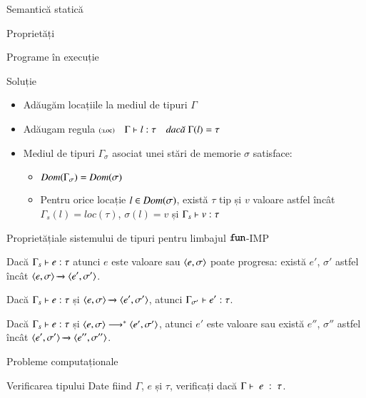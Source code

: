 \begin{section}{Semantică statică}
\begin{subsection}{Proprietăți}
\begin{frame}{Programe în execuție}
 \begin{block}{Soluție}
 \begin{itemize}
 \item Adăugăm locațiile la mediul de tipuri $\Gamma$
 \item Adăugam regula $\reg[:loc]{\T{\Gamma}{l}{\tau}}{}{\Gamma(l) = \tau}$
 \item Mediul de tipuri $\Gamma_\sigma$ asociat unei stări de memorie $\sigma$ satisface:
 \begin{itemize}
 \item $\mathop{\it Dom}(\Gamma_\sigma) = \mathop{\it Dom}(\sigma)$
 \item Pentru orice locație $l\in \mathop{\it Dom}(\sigma)$, există $\tau$ tip și $v$ valoare astfel încât $\Gamma_s(l) = loc(\tau)$, $\sigma(l) = v$ și ${\displaystyle {\Gamma_s} \vdash {v} : {\tau}}$
 \end{itemize}
 \end{itemize}
 \end{block}
\end{frame}

\begin{frame}{Proprietăți}{ale sistemului de tipuri pentru limbajul $\mathrel{\text{\ttfamily fun}}$-IMP}
\begin{theorem} Dacă ${\displaystyle {\Gamma_s} \vdash {e} : {\tau}}$ atunci $e$ este valoare sau ${\langle{e,\sigma}\rangle}$ poate progresa: există $e'$, $\sigma'$ astfel încât $\displaystyle{\ensuremath {{\langle{e,\sigma}\rangle}} \xrightarrow{} {{\ensuremath \langle{e',\sigma'}\rangle}}}$.
\end{theorem}
\vfill

\begin{theorem}
Dacă ${\displaystyle {\Gamma_s} \vdash {e} : {\tau}}$ și $\displaystyle{\ensuremath {{\langle{e,\sigma}\rangle}} \xrightarrow{} {{\ensuremath \langle{e',\sigma'}\rangle}}}$, atunci 
${\displaystyle {\Gamma_{\sigma'}} \vdash {e'} : {\tau}}$.
\end{theorem}

\vfill
\begin{theorem}
Dacă ${\displaystyle {\Gamma_s} \vdash {e} : {\tau}}$ și ${{\langle{e,\sigma}\rangle}}\longrightarrow^\ast{{\ensuremath \langle{e',\sigma'}\rangle}}$, atunci $e'$ este valoare sau există $e''$, $\sigma''$ astfel încât $\displaystyle{\ensuremath {{\langle{e',\sigma'}\rangle}} \xrightarrow{} {{\ensuremath \langle{e'',\sigma''}\rangle}}}$.
\end{theorem}

\end{frame}

\begin{frame}{Probleme computaționale}
\begin{block}{Verificarea tipului}
Date fiind $\Gamma$, $e$ și $\tau$, verificați dacă ${\displaystyle \Gamma\vdash \; e \; : \; \tau}$.
\end{block}


\end{frame}
\end{subsection}
\end{section}
